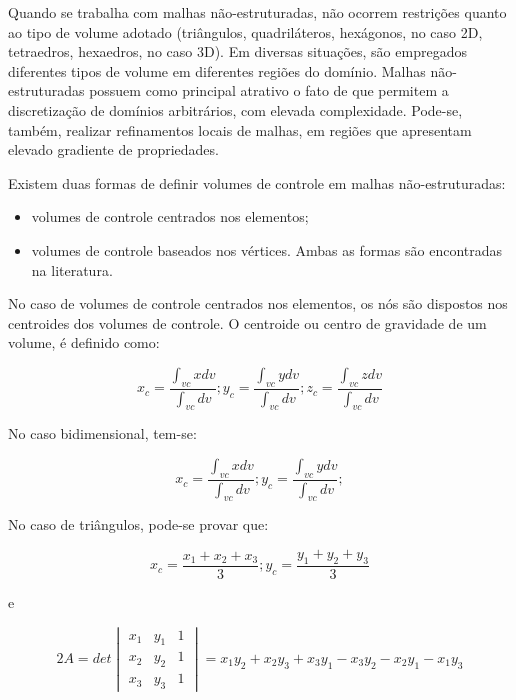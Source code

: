 Quando se trabalha com malhas não-estruturadas, não ocorrem restrições quanto ao tipo de volume adotado (triângulos, quadriláteros, hexágonos, no caso 2D, tetraedros, hexaedros, no caso 3D). Em diversas situações, são empregados diferentes tipos de volume em diferentes regiões do domínio. Malhas não-estruturadas possuem como principal atrativo o fato de que permitem a discretização de domínios arbitrários, com elevada complexidade. Pode-se, também, realizar refinamentos locais de malhas, em regiões que apresentam elevado gradiente de propriedades.

Existem duas formas de definir volumes de controle em malhas não-estruturadas:
\begin{itemize}
    \item volumes de controle centrados nos elementos;
    \item volumes de controle baseados nos vértices. Ambas as formas são encontradas na literatura.
\end{itemize}

No caso de volumes de controle centrados nos elementos, os nós são dispostos nos centroides dos volumes de controle. O centroide ou centro de gravidade de um volume, é definido como:

\begin{equation}
    \label{eq:6.1}
    x_c = \frac{\int_{vc}x dv}{\int_{vc}dv};
    y_c = \frac{\int_{vc}y dv}{\int_{vc}dv};
    z_c = \frac{\int_{vc}z dv}{\int_{vc}dv}
\end{equation}

No caso bidimensional, tem-se:

\begin{equation}
    \label{eq:6.2}
    x_c = \frac{\int_{vc}x dv}{\int_{vc}dv};
    y_c = \frac{\int_{vc}y dv}{\int_{vc}dv};
\end{equation}

No caso de triângulos, pode-se provar que:

\begin{equation}
    \label{eq:6.3}
    x_c = \frac{x_1+x_2+x_3}{3};
    y_c = \frac{y_1+y_2+y_3}{3}
\end{equation}

e

\begin{equation*}
    2A = det \begin{vmatrix}
        x_1 & y_1 & 1\\
        x_2 & y_2 & 1\\
        x_3 & y_3 & 1
    \end{vmatrix}
    = x_1y_2 + x_2y_3 + x_3y_1 - x_3y_2 - x_2y_1 - x_1y_3
\end{equation*}

